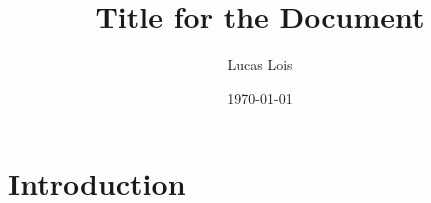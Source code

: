 \documentclass[12pt]{article}
\title{Title for the Document}
\author{Lucas Lois}
\date{\today}
\begin{document}
\maketitle
\begin{abstract}

  \blindtext

\end{abstract}

\section{Introduction}

\blindtext[10] \parencite{coulouris}
\printbibliography{}
\end{document}

